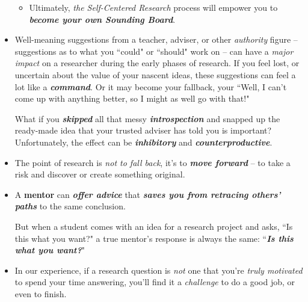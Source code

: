 \documentclass[11pt]{article}
\begin{document}
\begin{itemize}
\begin{itemize}
\item Ultimately, \emph{the Self-Centered Research} process will empower you to \emph{\textbf{become your own Sounding Board}}.
\end{itemize}

\item Well-meaning suggestions from a teacher, adviser, or other \emph{authority} figure -- suggestions as to what you ``could" or ``should" work on -- can have a \emph{major impact} on a researcher during the early phases of research. If you feel lost, or uncertain about the value of your nascent ideas, these suggestions can feel a lot like a \emph{\textbf{command}}. Or it may become your fallback, your ``Well, I can’t come up with anything better, so I might as well go with that!" 

What if you \emph{\textbf{skipped}} all that messy \emph{\textbf{introspection}} and snapped up the ready-made idea that your trusted adviser has told you is important? Unfortunately, the effect can be \emph{\textbf{inhibitory}} and \emph{\textbf{counterproductive}}.

\item The point of research is \emph{not to fall back}, it’s to \emph{\textbf{move forward}} -- to take a risk and discover or create something original. 

\item A \textbf{mentor} can \emph{\textbf{offer advice}} that \emph{\textbf{saves you from retracing others’ paths}} to the same conclusion. 

But when a student comes with an idea for a research project and asks, ``Is this what you want?" a true mentor’s response is always
the same: ``\emph{\textbf{Is this what you want?}}"

\item In our experience, if a research question is \emph{not} one that you’re \emph{truly motivated} to spend your time answering, you’ll find it a \emph{challenge} to do a good job, or even to finish. 
\end{itemize}
\end{document}
